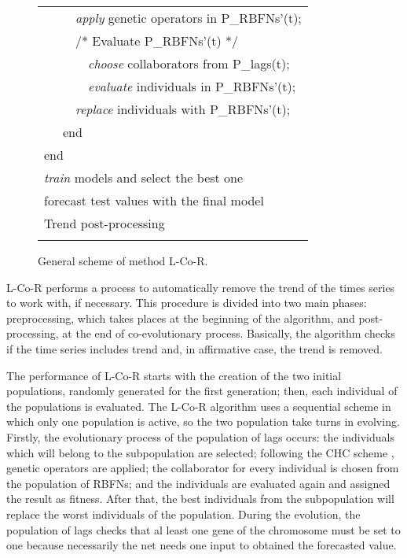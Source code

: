 \documentclass[a4paper,twoside]{article}
\newcommand{\metodo}{L-Co-R}
\begin{document}
\begin{figure}
\begin{tabular}{|l|}
\ \ \ \ \ \emph{apply} genetic operators in P\_RBFNs'(t); \\
\ \ \ \ \ /* Evaluate P\_RBFNs'(t) */  \\
\ \ \ \ \ \ \ \emph{choose} collaborators from P\_lags(t); \\
\ \ \ \ \ \ \ \emph{evaluate} individuals in P\_RBFNs'(t); \\
\ \ \ \ \ \emph{replace} individuals with P\_RBFNs'(t);  \\
\ \ \ end  \\
end  \\
\emph{train} models and select the best one \\
forecast test values with the final model \\
Trend post-processing \\
\\
\hline
\end{tabular}
\caption{General scheme of method {\metodo}.}
\label{generalscheme}
\end{figure}

{\metodo} performs a process to automatically remove the trend of the times series to work with, if necessary. This procedure is divided into two main phases: preprocessing, which takes places at the beginning of the algorithm, and post-processing, at the end of co-evolutionary process. Basically, the algorithm checks if the time series includes trend and, in affirmative case, the trend is removed.

The performance of {\metodo} starts with the creation of the two initial populations, randomly generated for the first generation; then, each individual of the populations is evaluated. The {\metodo} algorithm uses a sequential scheme in which only one population is active, so the two population take turns in evolving. Firstly, the evolutionary process of the population of lags occurs: the individuals which will belong to the subpopulation are selected; following the CHC scheme \cite{Eshelman}, genetic operators are applied; the collaborator for every individual is chosen from the population of RBFNs; and the individuals are evaluated again and assigned the result as fitness. After that, the best individuals from the subpopulation will replace the worst individuals of the population. During the evolution, the population of lags checks that al least one gene of the chromosome must be set to one because necessarily the net needs one input to obtained the forecasted value.
\end{document}
